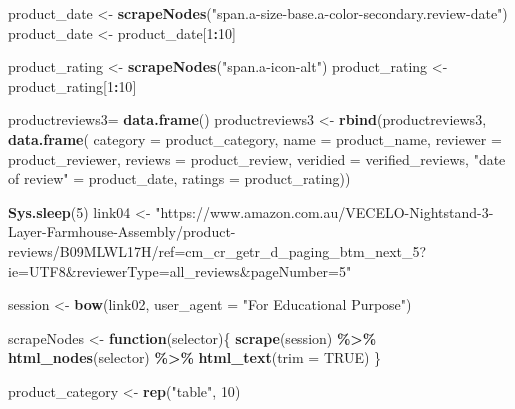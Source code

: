 \documentclass[
]{article}
\newenvironment{Shaded}{\begin{snugshade}}{\end{snugshade}}
\newcommand{\AttributeTok}[1]{\textcolor[rgb]{0.13,0.29,0.53}{#1}}
\newcommand{\ConstantTok}[1]{\textcolor[rgb]{0.56,0.35,0.01}{#1}}
\newcommand{\ControlFlowTok}[1]{\textcolor[rgb]{0.13,0.29,0.53}{\textbf{#1}}}
\newcommand{\DecValTok}[1]{\textcolor[rgb]{0.00,0.00,0.81}{#1}}
\newcommand{\FunctionTok}[1]{\textcolor[rgb]{0.13,0.29,0.53}{\textbf{#1}}}
\newcommand{\NormalTok}[1]{#1}
\newcommand{\OtherTok}[1]{\textcolor[rgb]{0.56,0.35,0.01}{#1}}
\newcommand{\SpecialCharTok}[1]{\textcolor[rgb]{0.81,0.36,0.00}{\textbf{#1}}}
\newcommand{\StringTok}[1]{\textcolor[rgb]{0.31,0.60,0.02}{#1}}
\begin{document}
\begin{Shaded}
\begin{Highlighting}[]
\NormalTok{  product\_date }\OtherTok{\textless{}{-}} \FunctionTok{scrapeNodes}\NormalTok{(}\StringTok{"span.a{-}size{-}base.a{-}color{-}secondary.review{-}date"}\NormalTok{)}
\NormalTok{  product\_date }\OtherTok{\textless{}{-}}\NormalTok{ product\_date[}\DecValTok{1}\SpecialCharTok{:}\DecValTok{10}\NormalTok{]}
  
\NormalTok{  product\_rating }\OtherTok{\textless{}{-}} \FunctionTok{scrapeNodes}\NormalTok{(}\StringTok{"span.a{-}icon{-}alt"}\NormalTok{)}
\NormalTok{  product\_rating }\OtherTok{\textless{}{-}}\NormalTok{ product\_rating[}\DecValTok{1}\SpecialCharTok{:}\DecValTok{10}\NormalTok{]}
  
\NormalTok{  productreviews3}\OtherTok{=} \FunctionTok{data.frame}\NormalTok{()}
\NormalTok{  productreviews3 }\OtherTok{\textless{}{-}} \FunctionTok{rbind}\NormalTok{(productreviews3, }\FunctionTok{data.frame}\NormalTok{(}
                      \AttributeTok{category =}\NormalTok{ product\_category,}
                      \AttributeTok{name =}\NormalTok{ product\_name,}
                      \AttributeTok{reviewer =}\NormalTok{ product\_reviewer,}
                      \AttributeTok{reviews =}\NormalTok{ product\_review,}
                      \AttributeTok{veridied =}\NormalTok{ verified\_reviews,}
                      \StringTok{"date of review"} \OtherTok{=}\NormalTok{ product\_date,}
                      \AttributeTok{ratings =}\NormalTok{ product\_rating))}
  
   \FunctionTok{Sys.sleep}\NormalTok{(}\DecValTok{5}\NormalTok{)}
\NormalTok{link04 }\OtherTok{\textless{}{-}} \StringTok{"https://www.amazon.com.au/VECELO{-}Nightstand{-}3{-}Layer{-}Farmhouse{-}Assembly/product{-}reviews/B09MLWL17H/ref=cm\_cr\_getr\_d\_paging\_btm\_next\_5?ie=UTF8\&reviewerType=all\_reviews\&pageNumber=5"}


\NormalTok{  session }\OtherTok{\textless{}{-}} \FunctionTok{bow}\NormalTok{(link02,}
               \AttributeTok{user\_agent =} \StringTok{"For Educational Purpose"}\NormalTok{)}

\NormalTok{  scrapeNodes }\OtherTok{\textless{}{-}} \ControlFlowTok{function}\NormalTok{(selector)\{}
    \FunctionTok{scrape}\NormalTok{(session) }\SpecialCharTok{\%\textgreater{}\%}
      \FunctionTok{html\_nodes}\NormalTok{(selector) }\SpecialCharTok{\%\textgreater{}\%}
      \FunctionTok{html\_text}\NormalTok{(}\AttributeTok{trim =} \ConstantTok{TRUE}\NormalTok{)}
\NormalTok{  \}}

\NormalTok{  product\_category }\OtherTok{\textless{}{-}} \FunctionTok{rep}\NormalTok{(}\StringTok{"table"}\NormalTok{, }\DecValTok{10}\NormalTok{)}


\end{Highlighting}
\end{Shaded}
\end{document}
